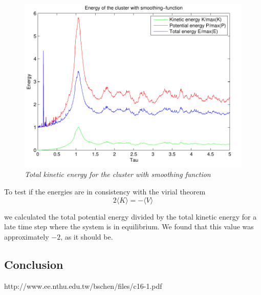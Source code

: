\documentclass[a4paper,12pt, english]{article}
\begin{document}
\begin{figure}
        \includegraphics[scale=0.5]{energy_n1000t5_N100.pdf}
        \caption{\textit{Total kinetic energy for the cluster with smoothing function}}
        \label{fig:totE}
\end{figure}

To test if the energies are in consistency with the virial theorem 
\[
2\langle K\rangle = -\langle V \rangle
\]

we calculated the total potential energy divided by the total kinetic energy for a late time step where the system is in equilibrium. We found that this value was approximately $-2$, as it should be.

  
\subsection*{Conclusion}
 

http://www.ee.nthu.edu.tw/bschen/files/c16-1.pdf
\end{document}
